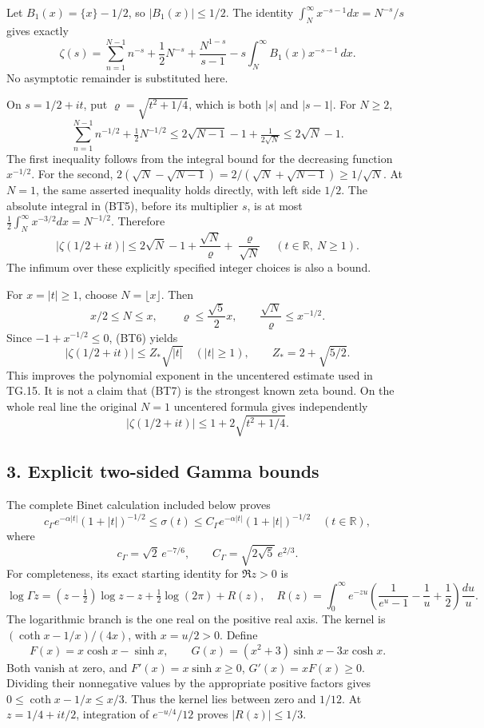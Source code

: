 \documentclass[11pt,a4paper]{article}
\begin{document}
Let \(B_1(x)=\{x\}-1/2\), so \(|B_1(x)|\le1/2\). The identity \(\int_N^\infty x^{-s-1}dx=N^{-s}/s\) gives exactly \[
\zeta(s)=\sum_{n=1}^{N-1}n^{-s}+\frac12N^{-s}
 +\frac{N^{1-s}}{s-1}
 -s\int_N^\infty B_1(x)x^{-s-1}\,dx.
\tag{BT5}
\] No asymptotic remainder is substituted here.

On \(s=1/2+it\), put \(\varrho=\sqrt{t^2+1/4}\), which is both \(|s|\) and \(|s-1|\). For \(N\ge2\), \[
\sum_{n=1}^{N-1}n^{-1/2}+\tfrac12N^{-1/2}
\le 2\sqrt{N-1}-1+\tfrac1{2\sqrt N}
\le 2\sqrt N-1.
\] The first inequality follows from the integral bound for the decreasing function \(x^{-1/2}\). For the second, \(2(\sqrt N-\sqrt{N-1})=2/(\sqrt N+\sqrt{N-1})\ge1/\sqrt N\). At \(N=1\), the same asserted inequality holds directly, with left side \(1/2\). The absolute integral in (BT5), before its multiplier \(s\), is at most \(\tfrac12\int_N^\infty x^{-3/2}dx=N^{-1/2}\). Therefore \[
|\zeta(1/2+it)|
\le 2\sqrt N-1+\frac{\sqrt N}{\varrho}
                       +\frac{\varrho}{\sqrt N}
\quad(t\in\mathbb R,\ N\ge1).
\tag{BT6}
\] The infimum over these explicitly specified integer choices is also a bound.

For \(x=|t|\ge1\), choose \(N=\lfloor x\rfloor\). Then \[
x/2\le N\le x,\qquad
\varrho\le\frac{\sqrt5}{2}x,\qquad
\frac{\sqrt N}{\varrho}\le x^{-1/2}.
\] Since \(-1+x^{-1/2}\le0\), (BT6) yields \[
\boxed{|\zeta(1/2+it)|\le Z_*\sqrt{|t|}\quad(|t|\ge1),
\qquad Z_*=2+\sqrt{5/2}.}
\tag{BT7}
\] This improves the polynomial exponent in the uncentered estimate used in TG.15. It is not a claim that (BT7) is the strongest known zeta bound. On the whole real line the original \(N=1\) uncentered formula gives independently \[
|\zeta(1/2+it)|\le 1+2\sqrt{t^2+1/4}.
\tag{BT8}
\]

\subsection{3. Explicit two-sided Gamma bounds}\label{explicit-two-sided-gamma-bounds}

The complete Binet calculation included below proves \[
\boxed{
c_\Gamma e^{-\alpha|t|}(1+|t|)^{-1/2}
\le \sigma(t)\le
C_\Gamma e^{-\alpha|t|}(1+|t|)^{-1/2}
\quad(t\in\mathbb R),}
\tag{BT9}
\] where \[
c_\Gamma=\sqrt2\,e^{-7/6},\qquad
C_\Gamma=\sqrt{2\sqrt5}\,e^{2/3}.
\tag{BT10}
\] For completeness, its exact starting identity for \(\Re z>0\) is \[
\log\Gamma z=(z-\tfrac12)\log z-z+\tfrac12\log(2\pi)+R(z),
\quad
R(z)=\int_0^\infty e^{-zu}
 \left(\frac1{e^u-1}-\frac1u+\frac12\right)\frac{du}{u}.
\] The logarithmic branch is the one real on the positive real axis. The kernel is \((\coth x-1/x)/(4x)\), with \(x=u/2>0\). Define \[
F(x)=x\cosh x-\sinh x,\qquad
G(x)=(x^2+3)\sinh x-3x\cosh x.
\] Both vanish at zero, and \(F'(x)=x\sinh x\ge0\), \(G'(x)=xF(x)\ge0\). Dividing their nonnegative values by the appropriate positive factors gives \(0\le\coth x-1/x\le x/3\). Thus the kernel lies between zero and \(1/12\). At \(z=1/4+it/2\), integration of \(e^{-u/4}/12\) proves \(|R(z)|\le1/3\).
\end{document}

